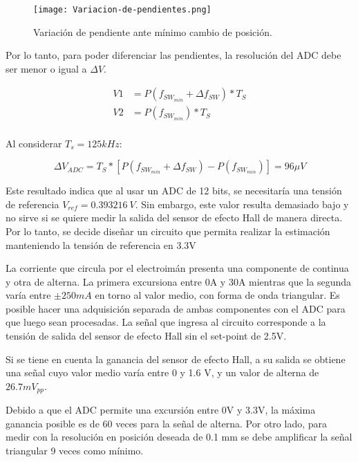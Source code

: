 \begin{figure}[H]
	\centering
	\texttt{[image: Variacion-de-pendientes.png]}
	\caption{Variación de pendiente ante mínimo cambio de posición.}
	\label{fig:variacion-de-pendiente}
\end{figure}

\noindent Por lo tanto, para poder diferenciar las pendientes, la resolución del ADC debe ser menor o igual a $\Delta V$.

\begin{equation} 
	\begin{aligned}
		V1 &= P(f_{SW_{min}} + \Delta f_{SW})* T_S \\
		V2 &= P(f_{SW_{min}})* T_S \\		 
	\end{aligned}
\end{equation}

\noindent Al considerar $T_s = 125 kHz$:

\begin{equation} 
	\Delta V_{ADC} = T_S * [P(f_{SW_{min}} + \Delta f_{SW}) - P(f_{SW_{min}})] = 96 \mu V
\end{equation}



\noindent Este resultado indica que al usar un ADC de 12 bits, se necesitaría una tensión de referencia $V_{ref} = 0.393216\:V$. Sin embargo, este valor resulta demasiado bajo y no sirve si se quiere medir la salida del sensor de efecto Hall de manera directa. Por lo tanto, se decide diseñar un circuito que permita realizar la estimación manteniendo la tensión de referencia en 3.3V

\noindent La corriente que circula por el electroimán presenta una componente de continua y otra de alterna. La primera excursiona entre 0A y 30A mientras que la segunda varía entre $\pm 250 mA$ en torno al valor medio, con forma de onda triangular. Es posible hacer una adquisición separada de ambas componentes con el ADC para que luego sean procesadas. La señal que ingresa al circuito corresponde a la tensión de salida del sensor de efecto Hall sin el set-point de 2.5V.

\noindent Si se tiene en cuenta la ganancia del sensor de efecto Hall, a su salida se obtiene una señal cuyo valor medio varía entre 0 y 1.6 V, y un valor de alterna de $26.7 mV_{pp}$.

\noindent Debido a que el ADC permite una excursión entre 0V y 3.3V, la máxima ganancia posible es de 60 veces para la señal de alterna. Por otro lado, para medir con la resolución en posición deseada de 0.1 mm se debe amplificar la señal triangular 9 veces como mínimo.

